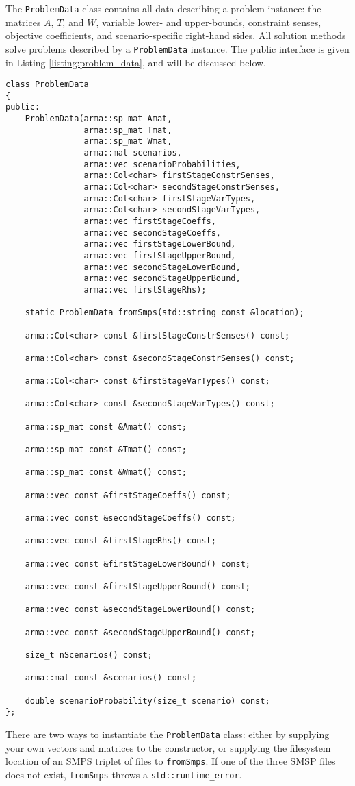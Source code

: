 \documentclass[12pt, english]{article}
\begin{document}
The \texttt{ProblemData} class contains all data describing a problem instance: the matrices $A$, $T$, and $W$, variable lower- and upper-bounds, constraint senses, objective coefficients, and scenario-specific right-hand sides. All solution methods solve problems described by a \texttt{ProblemData} instance. The public interface is given in Listing \ref{listing:problem_data}, and will be discussed below.
\begin{lstlisting}[caption={Public interface of the \texttt{ProblemData} class.},
                   label={listing:problem_data}]
class ProblemData
{
public:
    ProblemData(arma::sp_mat Amat,
				arma::sp_mat Tmat,
				arma::sp_mat Wmat,
				arma::mat scenarios,
				arma::vec scenarioProbabilities,
				arma::Col<char> firstStageConstrSenses,
				arma::Col<char> secondStageConstrSenses,
				arma::Col<char> firstStageVarTypes,
				arma::Col<char> secondStageVarTypes,
				arma::vec firstStageCoeffs,
				arma::vec secondStageCoeffs,
				arma::vec firstStageLowerBound,
				arma::vec firstStageUpperBound,
				arma::vec secondStageLowerBound,
				arma::vec secondStageUpperBound,
				arma::vec firstStageRhs);

	static ProblemData fromSmps(std::string const &location);
	
	arma::Col<char> const &firstStageConstrSenses() const;
	
	arma::Col<char> const &secondStageConstrSenses() const;
		
	arma::Col<char> const &firstStageVarTypes() const;
	
	arma::Col<char> const &secondStageVarTypes() const;
		
	arma::sp_mat const &Amat() const;
		
	arma::sp_mat const &Tmat() const;
	
	arma::sp_mat const &Wmat() const;
		
	arma::vec const &firstStageCoeffs() const;
	
	arma::vec const &secondStageCoeffs() const;
	
	arma::vec const &firstStageRhs() const;
	
	arma::vec const &firstStageLowerBound() const;
	
	arma::vec const &firstStageUpperBound() const;
	
	arma::vec const &secondStageLowerBound() const;
	
	arma::vec const &secondStageUpperBound() const;
	
	size_t nScenarios() const;
	
	arma::mat const &scenarios() const;
	
	double scenarioProbability(size_t scenario) const;
};
\end{lstlisting}
There are two ways to instantiate the \texttt{ProblemData} class: either by supplying your own vectors and matrices to the constructor, or supplying the filesystem location of an SMPS triplet of files to \texttt{fromSmps}. If one of the three SMSP files does not exist, \texttt{fromSmps} throws a \texttt{std::runtime\_error}.
\end{document}
